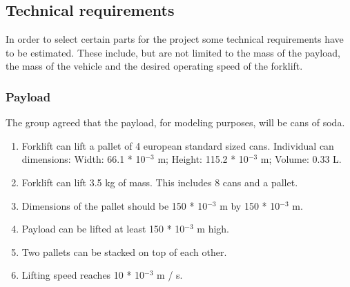 \documentclass[../report.tex]{subfiles}
\begin{document}
    \subsection{Technical requirements}
        In order to select certain parts for the project some technical requirements 
        have to be estimated. These include, but are not limited to the mass of the 
        payload, the mass of the vehicle and the desired operating speed of the 
        forklift.

        \subsubsection{Payload} %
           The group agreed that the payload, for modeling purposes, will be cans of soda.
           \begin{center}
                \begin{enumerate}
                    \item Forklift can lift a pallet of 4 european standard sized cans. Individual can dimensions: Width: 66.1 * 10$^{-3}$ m; Height: 115.2 * 10$^{-3}$ m; Volume: 0.33 L. %
                    \item Forklift can lift  3.5 kg of mass. This includes 8 cans and a pallet. %
                    \item Dimensions of the pallet should be 150 * 10$^{-3}$ m by 150 * 10$^{-3}$ m. %
                    \item Payload can be lifted at least 150 * 10$^{-3}$ m high. %
                    \item Two pallets can be stacked on top of each other.
                    \item Lifting speed reaches 10 * 10$^{-3}$ m / s. %
                \end{enumerate}
            \end{center}
\end{document}
